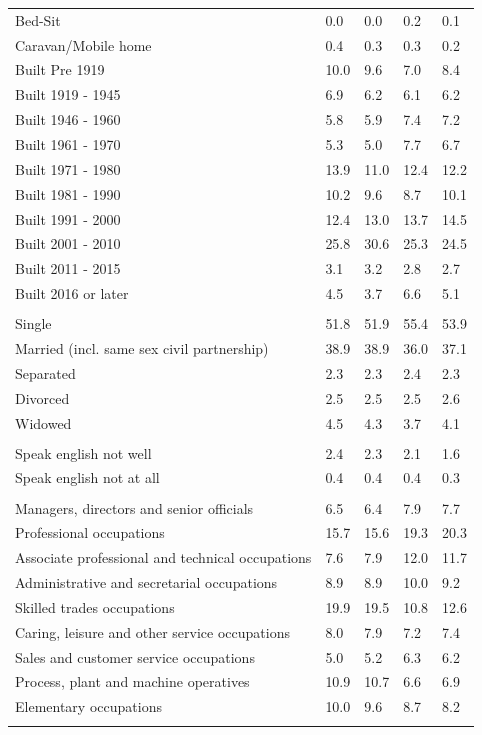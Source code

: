 \documentclass{article}
\begin{document}
\begin{table}[h]
\begin{tabular}{KTTTT}
Bed-Sit & 0.0& 0.0& 0.2& 0.1\\
Caravan/Mobile home & 0.4& 0.3& 0.3& 0.2\\
    \hline
Built Pre 1919 & 10.0&  9.6&  7.0&  8.4\\
Built 1919 - 1945 & 6.9& 6.2& 6.1& 6.2\\
Built  1946 - 1960 & 5.8& 5.9& 7.4& 7.2\\
Built  1961 - 1970 & 5.3& 5.0& 7.7& 6.7\\
Built  1971 - 1980 & 13.9& 11.0& 12.4& 12.2\\
Built  1981 - 1990 & 10.2&  9.6&  8.7& 10.1\\
Built  1991 - 2000 & 12.4& 13.0& 13.7& 14.5\\
Built  2001 - 2010 & 25.8& 30.6& 25.3& 24.5\\
Built  2011 - 2015 & 3.1& 3.2& 2.8& 2.7\\
Built  2016 or later & 4.5& 3.7& 6.6& 5.1\\
\hline
    \\
    \hline
Single & 51.8& 51.9& 55.4& 53.9\\
Married (incl. same sex civil partnership) & 38.9& 38.9& 36.0& 37.1\\
Separated  & 2.3& 2.3& 2.4& 2.3\\
Divorced  & 2.5& 2.5& 2.5& 2.6\\
Widowed & 4.5& 4.3& 3.7& 4.1\\
\hline
    \\ 
    \hline
Speak english not well & 2.4& 2.3& 2.1& 1.6\\
Speak english not at all & 0.4& 0.4& 0.4& 0.3\\
\hline
    \\
    \hline
Managers, directors and senior officials & 6.5& 6.4& 7.9& 7.7\\
Professional occupations & 15.7& 15.6& 19.3& 20.3\\
Associate professional and technical occupations &  7.6&  7.9& 12.0& 11.7\\
Administrative and secretarial occupations &  8.9&  8.9& 10.0&  9.2\\
Skilled trades occupations & 19.9& 19.5& 10.8& 12.6\\
Caring, leisure and other service occupations & 8.0& 7.9& 7.2& 7.4\\
Sales and customer service occupations & 5.0& 5.2& 6.3& 6.2\\
Process, plant and machine operatives & 10.9& 10.7&  6.6&  6.9\\
Elementary occupations & 10.0&  9.6&  8.7&  8.2\\
\hline
\end{tabular}
\end{table}
\end{document}
